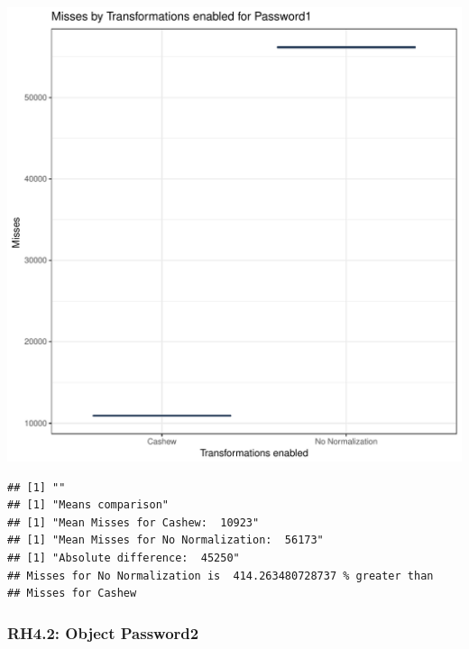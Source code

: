 \documentclass{article}\usepackage[]{graphicx}\usepackage[]{color}
\makeatletter
\def\maxwidth{ %
  \ifdim\Gin@nat@width>\linewidth
    \linewidth
  \else
    \Gin@nat@width
  \fi
}
\newenvironment{kframe}{%
 \def\at@end@of@kframe{}%
 \ifinner\ifhmode%
  \def\at@end@of@kframe{\end{minipage}}%
  \begin{minipage}{\columnwidth}%
 \fi\fi%
 \def\FrameCommand##1{\hskip\@totalleftmargin \hskip-\fboxsep
 \colorbox{shadecolor}{##1}\hskip-\fboxsep
     \hskip-\linewidth \hskip-\@totalleftmargin \hskip\columnwidth}%
 \MakeFramed {\advance\hsize-\width
   \@totalleftmargin\z@ \linewidth\hsize
   \@setminipage}}%
 {\par\unskip\endMakeFramed%
 \at@end@of@kframe}
\newenvironment{knitrout}{}{} %
\makeatother
\begin{document}
\begin{knitrout}
\color{fgcolor}
\includegraphics[width=\maxwidth]{figure/RH4_password-1} 
\begin{kframe}

{\ttfamily\noindent\bfseries\color{errorcolor}{\#\# Error in eval(expr, envir, enclos): object 'shap\_cashew\_password' not found}}\begin{verbatim}
## [1] ""
## [1] "Means comparison"
## [1] "Mean Misses for Cashew:  10923"
## [1] "Mean Misses for No Normalization:  56173"
## [1] "Absolute difference:  45250"
## Misses for No Normalization is  414.263480728737 % greater than 
## Misses for Cashew
\end{verbatim}
\end{kframe}
\end{knitrout}


\subsubsection{RH4.2: Object Password2}
\end{document}
